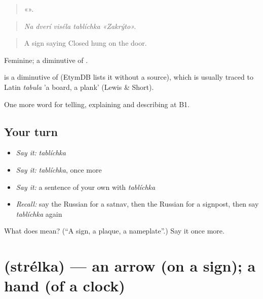 \begin{quote}
    «».
\end{quote}

\begin{quote}
\emph{Na dverí viséla tablíchka «Zakrýto».}
\end{quote}

\begin{quote}
A sign saying Closed hung on the door.
\end{quote}

Feminine; a diminutive of \emph{}.

\begin{cousinweb}
\emph{} is a diminutive of \emph{} (EtymDB lists it without a source), which is usually traced to Latin \emph{tabula} 'a board, a plank' (Lewis \& Short).
\end{cousinweb}

\begin{grammarlens}[title={What you've built}]
One more word for telling, explaining and describing at B1.
\end{grammarlens}

\subsection*{Your turn}
\begin{itemize}
\raggedright
  \item \emph{Say it:} \emph{tablíchka}
  \item \emph{Say it:} \emph{tablíchka}, once more
  \item \emph{Say it:} a sentence of your own with \emph{tablíchka}
  \item \emph{Recall:} say the Russian for a satnav, then the Russian for a signpost, then say \emph{tablíchka} again
\end{itemize}

\begin{tcolorbox}[breakable,colback=teal!4,colframe=teal!35!black,title={Before you move on}]
What does  mean? (\textquotedblleft{}A sign, a plaque, a nameplate\textquotedblright{}.) Say it once more.
\end{tcolorbox}
\section[\texorpdfstring{\ru{стрелка} (strélka)}{стрелка (strélka)}]{ (strélka) — an arrow (on a sign); a hand (of a clock)}

